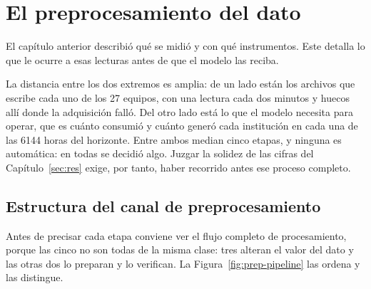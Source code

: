 %
%
\section{El preprocesamiento del dato}
\label{sec:prep}
\justifying

El capítulo anterior describió qué se midió y con qué instrumentos. Este
detalla lo que le ocurre a esas lecturas antes de que el modelo las
reciba.

La distancia entre los dos extremos es amplia: de un lado están los
archivos que escribe cada uno de los 27 equipos, con una lectura cada dos
minutos y huecos allí donde la adquisición falló. Del otro lado está lo
que el modelo necesita para operar, que es cuánto consumió y cuánto generó
cada institución en cada una de las \num{6144} horas del horizonte. Entre
ambos median cinco etapas, y ninguna es automática: en todas se decidió
algo. Juzgar la solidez de las cifras del
Capítulo~\ref{sec:res} exige, por tanto, haber recorrido antes ese
proceso completo.

\subsection{Estructura del canal de preprocesamiento}
\label{sub:prep-mapa}

Antes de precisar cada etapa conviene ver el flujo completo de
procesamiento, porque las cinco no son todas de la misma clase: tres
alteran el valor del dato y las otras dos lo preparan y lo verifican. La
Figura~\ref{fig:prep-pipeline} las ordena y las distingue.


